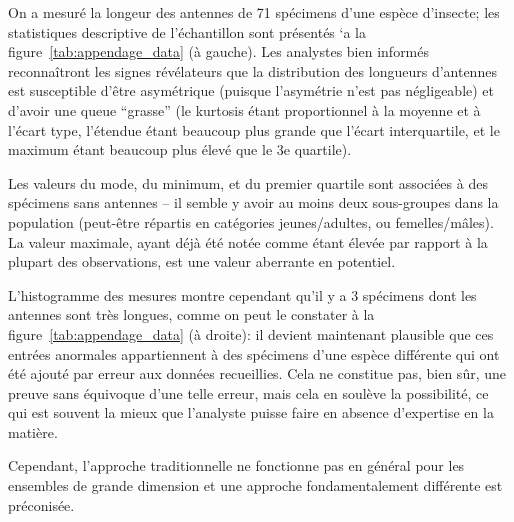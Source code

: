 \begin{Exemple}
On a mesur\'e la longeur des antennes de 71 sp\'ecimens d'une esp\`ece d'insecte; les statistiques descriptive de l'\'echantillon sont pr\'esent\'es `a la figure~\ref{tab:appendage_data} (\`a gauche).
\newpage\noindent Les analystes bien inform\'es reconnaîtront les signes révélateurs que la distribution des longueurs d'antennes est susceptible d'être asymétrique (puisque l'asymétrie n'est pas négligeable) et d'avoir une queue ``grasse'' (le kurtosis étant proportionnel à la moyenne et à l'écart type, l'étendue étant beaucoup plus grande que l'\'ecart interquartile, et le maximum étant beaucoup plus \'elev\'e que le 3e quartile). \par Les valeurs du mode, du minimum, et du premier quartile sont associ\'ees à des sp\'ecimens sans antennes -- il semble y avoir au moins deux sous-groupes dans la population (peut-être répartis en catégories jeunes/adultes, ou femelles/m\^ales). La valeur maximale, ayant déjà été not\'ee comme étant \'elev\'ee par rapport \`a la plupart des ob\-ser\-va\-tions, est une valeur aberrante en potentiel. \par L'histogramme des mesures montre cependant qu'il y a 3 sp\'ecimens dont les antennes sont très longues, comme on peut le constater \`a la figure~\ref{tab:appendage_data} (\`a droite): il devient maintenant plausible que ces entrées anormales appartiennent à des sp\'ecimens d'une espèce différente qui ont été ajout\'e par erreur aux donn\'ees recueillies. Cela ne constitue pas, bien sûr, une preuve sans \'equivoque  d'une telle erreur, mais cela en soulève la possibilité, ce qui est souvent la mieux que l'analyste puisse faire en absence d'expertise en la matière.
\end{Exemple}
\noindent Cependant, l'approche traditionnelle ne fonctionne pas en g\'en\'eral pour les ensembles de grande dimension et une approche fondamentalement différente est préconisée.\newpage  
